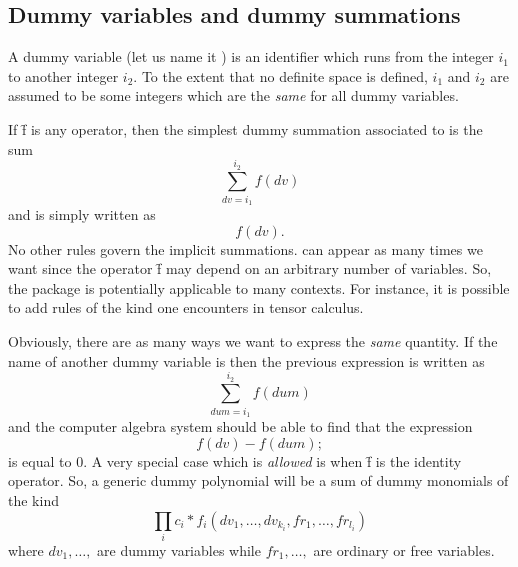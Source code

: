  \subsection{Dummy variables and dummy summations}
A dummy variable (let us name it ) is an identifier which runs from 
the integer $i_1$ to another integer $i_2$. To the extent that no 
definite space is defined, $i_1$ and $i_2$ are assumed to be some 
integers which are the \emph{same} for all dummy variables.

If \f{f} is any {\REDUCE} operator, then the simplest dummy summation 
associated to  is the sum
\[
\sum_{dv=i_1}^{i_2} f(dv)
\]
and is simply written as
\[
f(dv). 
\]
No other rules govern the implicit summations.  can appear as many times
we want since the operator \f{f} may depend on an arbitrary number of 
variables. So, the package is potentially applicable to many contexts.
For instance, it is possible to add rules of the kind one encounters in 
tensor calculus.      

Obviously, there are as many ways we want to express the \emph{same} quantity.
If the name of another dummy variable is  then 
the previous expression is written as
\[
\sum_{dum=i_1}^{i_2} f(dum)
\]
and the computer algebra system should be able to find that the expression
\[
f(dv)-f(dum);
\]
is equal to $0$.
A very special case which is \emph{allowed} is when \f{f} is the identity 
operator.
So, a generic dummy polynomial will be a sum 
of dummy monomials of the  kind
\[
\prod_i c_i*f_i(dv_1,\ldots ,dv_{k_i},fr_1,\ldots , fr_{l_i})
\]
where $dv_1,\ldots,$ are dummy variables while $fr_1, \ldots, $ 
are ordinary or free variables. 

